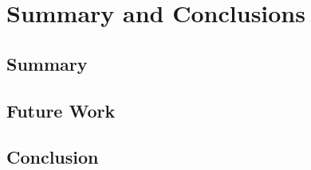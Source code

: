 \chapter{Summary and Conclusions}\label{ch:Conclusion}

\section{Summary}

\section{Future Work}

\section{Conclusion}
